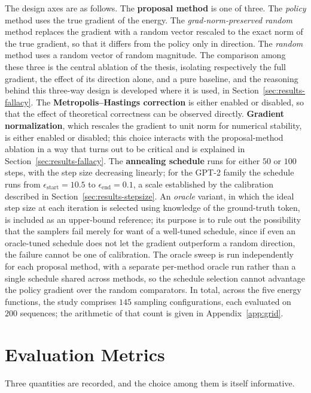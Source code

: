 The design axes are as follows. The \textbf{proposal method} is one of three. The \emph{policy} method uses the true gradient of the energy. The \emph{grad-norm-preserved random} method replaces the gradient with a random vector rescaled to the exact norm of the true gradient, so that it differs from the policy only in direction. The \emph{random} method uses a random vector of random magnitude. The comparison among these three is the central ablation of the thesis, isolating respectively the full gradient, the effect of its direction alone, and a pure baseline, and the reasoning behind this three-way design is developed where it is used, in Section~\ref{sec:results-fallacy}. The \textbf{Metropolis--Hastings correction} is either enabled or disabled, so that the effect of theoretical correctness can be observed directly. \textbf{Gradient normalization}, which rescales the gradient to unit norm for numerical stability, is either enabled or disabled; this choice interacts with the proposal-method ablation in a way that turns out to be critical and is explained in Section~\ref{sec:results-fallacy}. The \textbf{annealing schedule} runs for either $50$ or $100$ steps, with the step size decreasing linearly; for the GPT-2 family the schedule runs from $\epsilon_{\text{start}} = 10.5$ to $\epsilon_{\text{end}} = 0.1$, a scale established by the calibration described in Section~\ref{sec:results-stepsize}. An \emph{oracle} variant, in which the ideal step size at each iteration is selected using knowledge of the ground-truth token, is included as an upper-bound reference; its purpose is to rule out the possibility that the samplers fail merely for want of a well-tuned schedule, since if even an oracle-tuned schedule does not let the gradient outperform a random direction, the failure cannot be one of calibration. The oracle sweep is run independently for each proposal method, with a separate per-method oracle run rather than a single schedule shared across methods, so the schedule selection cannot advantage the policy gradient over the random comparators. In total, across the five energy functions, the study comprises $145$ sampling configurations, each evaluated on $200$ sequences; the arithmetic of that count is given in Appendix~\ref{app:grid}.

\section{Evaluation Metrics}
\label{sec:meth-metrics}

Three quantities are recorded, and the choice among them is itself informative.


